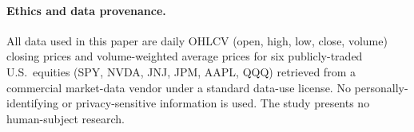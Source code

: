 \documentclass[sigconf,anonymous,nonacm=true]{acmart}
\begin{document}
\paragraph{Ethics and data provenance.} All data used in this paper
are daily OHLCV (open, high, low, close, volume) closing prices and
volume-weighted average prices for six publicly-traded U.S.\ equities
(SPY, NVDA, JNJ, JPM, AAPL, QQQ) retrieved from a commercial market-data
vendor under a standard data-use license. No personally-identifying or
privacy-sensitive information is used. The study presents no human-subject
research.



\end{document}
